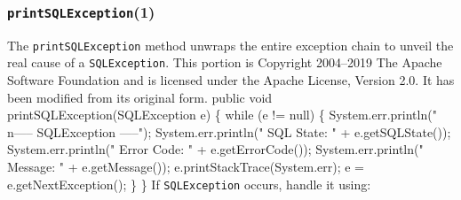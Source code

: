 \documentclass{article}
\def\nwendcode{\endtrivlist \endgroup}
\theoremstyle{definition}
\begin{document}
\subsubsection{{\tt{}\protect{}printSQLException}(1)}
\label{sec:print-sql-exceptions}
The {\tt{}\protect{}printSQLException} method  unwraps the entire exception chain to unveil
the real cause of a {\tt{}SQLException}.  This portion is Copyright 2004--2019 The
Apache Software Foundation and is licensed under the Apache License, Version
2.0. It has been modified from its original form.
\nwenddocs{}\endmoddef{}
public void printSQLException(SQLException e) \{
  while (e != null) \{
    System.err.println("\\n----- SQLException -----");
    System.err.println("  SQL State:  " + e.getSQLState());
    System.err.println("  Error Code: " + e.getErrorCode());
    System.err.println("  Message:    " + e.getMessage());
    e.printStackTrace(System.err);
    e = e.getNextException();
  \}
\}
\eatline
{}\nwendcode{}If {\tt{}SQLException} occurs, handle it using:
\end{document}
